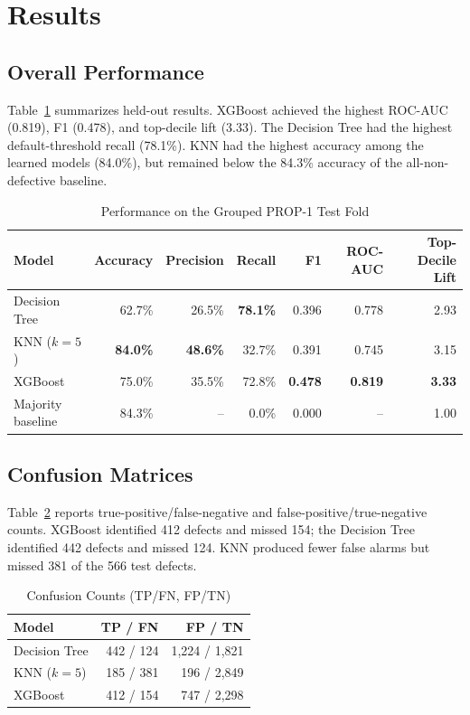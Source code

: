 \documentclass[conference]{IEEEtran}
\begin{document}
\section{Results}
\subsection{Overall Performance}
Table~\ref{tab:metrics} summarizes held-out results. XGBoost achieved the highest ROC-AUC (0.819), F1 (0.478), and top-decile lift (3.33). The Decision Tree had the highest default-threshold recall (78.1\%). KNN had the highest accuracy among the learned models (84.0\%), but remained below the 84.3\% accuracy of the all-non-defective baseline.

\begin{table}[t]
\caption{Performance on the Grouped PROP-1 Test Fold}
\label{tab:metrics}
\centering
\footnotesize
\begin{tabular}{lrrrrrr}
\toprule
\textbf{Model} & \textbf{Accuracy} & \textbf{Precision} & \textbf{Recall} & \textbf{F1} & \textbf{ROC-AUC} & \textbf{Top-Decile Lift}\\
\midrule
Decision Tree & 62.7\% & 26.5\% & \textbf{78.1\%} & 0.396 & 0.778 & 2.93\\
KNN ($k=5$) & \textbf{84.0\%} & \textbf{48.6\%} & 32.7\% & 0.391 & 0.745 & 3.15\\
XGBoost & 75.0\% & 35.5\% & 72.8\% & \textbf{0.478} & \textbf{0.819} & \textbf{3.33}\\
Majority baseline & 84.3\% & -- & 0.0\% & 0.000 & -- & 1.00\\
\bottomrule
\end{tabular}
\end{table}

\subsection{Confusion Matrices}
Table~\ref{tab:confusion} reports true-positive/false-negative and false-positive/true-negative counts. XGBoost identified 412 defects and missed 154; the Decision Tree identified 442 defects and missed 124. KNN produced fewer false alarms but missed 381 of the 566 test defects.

\begin{table}[t]
\caption{Confusion Counts (TP/FN, FP/TN)}
\label{tab:confusion}
\centering
\footnotesize
\begin{tabular}{lrr}
\toprule
\textbf{Model} & \textbf{TP / FN} & \textbf{FP / TN}\\
\midrule
Decision Tree & 442 / 124 & 1,224 / 1,821\\
KNN ($k=5$) & 185 / 381 & 196 / 2,849\\
XGBoost & 412 / 154 & 747 / 2,298\\
\bottomrule
\end{tabular}
\end{table}
\end{document}
